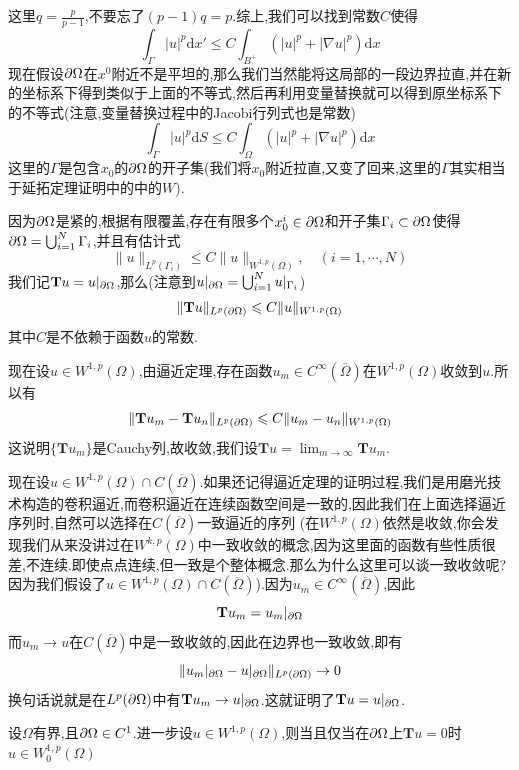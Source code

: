 这里$q=\frac{p}{p-1}$,不要忘了$(p-1)q=p$.综上,我们可以找到常数$C$使得
$$
\int_{\Gamma}|u|^p\mathrm{d}x'\leqslant C\int_{B^+}(|u|^p+|\nabla u|^p)\mathrm{d}x
$$
现在假设$\partial\Omega$在$x^0$附近不是平坦的,那么我们当然能将这局部的一段边界拉直,并在新的坐标系下得到类似于上面的不等式,然后再利用变量替换就可以得到原坐标系下的不等式(注意,变量替换过程中的Jacobi行列式也是常数)
$$
\int_{\Gamma}|u|^p\mathrm{d}S\leqslant C\int_{\Omega}(|u|^p+|\nabla u|^p)\mathrm{d}x
$$
这里的$\Gamma$是包含$x_0$的$\partial\Omega$的开子集(我们将$x_0$附近拉直,又变了回来,这里的$\Gamma$其实相当于延拓定理证明中的中的$W$).\par
因为$\partial\Omega$是紧的,根据有限覆盖,存在有限多个$x_0^i\in\partial\Omega$和开子集$\Gamma_i\subset\partial\Omega$使得$\partial\Omega=\bigcup_{i=1}^N\Gamma_i$,并且有估计式
$$
\|u\|_{L^p(\Gamma_i)}\leqslant C\|u\|_{W^{1,p}(\Omega)},\quad (i=1,\cdots,N)
$$
我们记$\mathbf{T}u=u|_{\partial\Omega}$,那么(注意到$u|_{\partial\Omega}=\bigcup_{i=1}^Nu|_{\Gamma_i}$)
$$
\|\mathbf{T}u\|_{L^p(\partial\Omega)}\leqslant C\|u\|_{W^{1,p}(\Omega)}
$$
其中$C$是不依赖于函数$u$的常数.\par
现在设$u\in W^{1,p}(\Omega)$,由逼近定理,存在函数$u_m\in C^{\infty}(\overline{\Omega})$在$W^{1,p}(\Omega)$收敛到$u$.所以有
$$
\|\mathbf{T}u_m-\mathbf{T}u_n\|_{L^p(\partial\Omega)}\leqslant C\|u_m-u_n\|_{W^{1,p}(\Omega)}
$$
这说明$\{\mathbf{T}u_m\}$是Cauchy列,故收敛,我们设$\mathbf{T}u=\lim_{m\to\infty}\mathbf{T}u_m$.\par
现在设$u\in W^{1,p}(\Omega)\cap C(\overline{\Omega})$.如果还记得逼近定理的证明过程,我们是用磨光技术构造的卷积逼近,而卷积逼近在连续函数空间是一致的,因此我们在上面选择逼近序列时,自然可以选择在$C(\overline{\Omega})$一致逼近的序列
(在$W^{1,p}(\Omega)$依然是收敛,你会发现我们从来没讲过在$W^{k,p}(\Omega)$中一致收敛的概念,因为这里面的函数有些性质很差,不连续.即使点点连续,但一致是个整体概念.那么为什么这里可以谈一致收敛呢?因为我们假设了$u\in W^{1,p}(\Omega)\cap C(\overline{\Omega})$).因为$u_m\in C^{\infty}(\overline{\Omega})$,因此
$$
\mathbf{T}u_m=u_m|_{\partial\Omega}
$$
而$u_m\to u$在$C(\overline{\Omega})$中是一致收敛的,因此在边界也一致收敛,即有
$$
\|u_m|_{\partial\Omega}-u|_{\partial\Omega}\|_{L^p(\partial\Omega)}\to 0
$$
换句话说就是在$L^p(\partial\Omega)$中有$\mathbf{T}u_m\to u|_{\partial\Omega}$.这就证明了$\mathbf{T}u=u|_{\partial\Omega}$.
\begin{tcolorbox}[colback=KuangNei,colframe=BianKuang,title=\textbf{$W^{1,p}(\Omega)$中的迹零函数},sharpish corners]
   设$\Omega$有界,且$\partial\Omega\in C^1$.进一步设$u\in W^{1,p}(\Omega)$,则当且仅当在$\partial\Omega$上$\mathbf{T}u=0$时$u\in W^{1,p}_0(\Omega)$
\end{tcolorbox}

